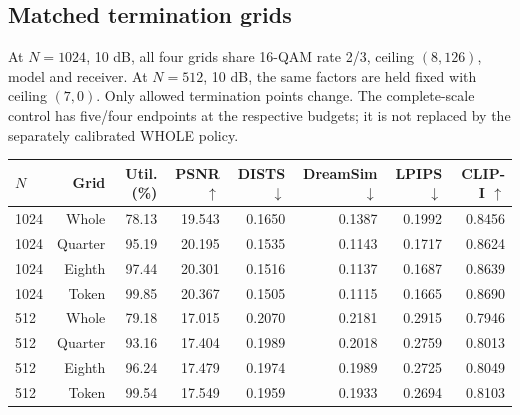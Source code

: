 \documentclass[10pt,letterpaper]{article}
\begin{document}
\subsection{Matched termination grids}
At $N=1024$, 10 dB, all four grids share 16-QAM rate 2/3, ceiling $(8,126)$, model and receiver. At $N=512$, 10 dB, the same factors are held fixed with ceiling $(7,0)$. Only allowed termination points change. The complete-scale control has five/four endpoints at the respective budgets; it is not replaced by the separately calibrated WHOLE policy.

{\small\setlength{\tabcolsep}{3pt}\renewcommand{\arraystretch}{1.08}
\begin{longtable}{@{}lrrrrrrr@{}}\toprule
$N$ & Grid & Util. (\%) & PSNR $\uparrow$ & DISTS $\downarrow$ & DreamSim $\downarrow$ & LPIPS $\downarrow$ & CLIP-I $\uparrow$\\\midrule\endhead
1024 & Whole & 78.13 & 19.543 & 0.1650 & 0.1387 & 0.1992 & 0.8456\\
1024 & Quarter & 95.19 & 20.195 & 0.1535 & 0.1143 & 0.1717 & 0.8624\\
1024 & Eighth & 97.44 & 20.301 & 0.1516 & 0.1137 & 0.1687 & 0.8639\\
1024 & Token & 99.85 & 20.367 & 0.1505 & 0.1115 & 0.1665 & 0.8690\\
512 & Whole & 79.18 & 17.015 & 0.2070 & 0.2181 & 0.2915 & 0.7946\\
512 & Quarter & 93.16 & 17.404 & 0.1989 & 0.2018 & 0.2759 & 0.8013\\
512 & Eighth & 96.24 & 17.479 & 0.1974 & 0.1989 & 0.2725 & 0.8049\\
512 & Token & 99.54 & 17.549 & 0.1959 & 0.1933 & 0.2694 & 0.8103\\
\bottomrule\end{longtable}}
\end{document}
